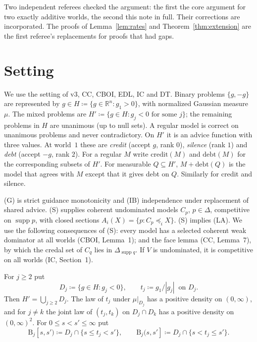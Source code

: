 \documentclass[11pt]{article}
\theoremstyle{definition}\newtheorem{definition}[theorem]{Definition}
\theoremstyle{remark}\newtheorem{remark}[theorem]{Remark}
\newcommand{\R}{\mathbb R}
\newcommand{\supp}{\operatorname{supp}}
\newcommand{\debt}{\mathrm{debt}}
\newcommand{\cred}{\mathrm{credit}}
\newcommand{\Band}{\mathrm{B}}
\begin{document}
Two independent referees checked the argument: the first the core argument
for two exactly additive worlds, the second this note in full. Their
corrections are incorporated. The proofs of Lemma~\ref{lem:rates} and
Theorem~\ref{thm:extension} are the first referee's replacements for proofs
that had gaps.

\section{Setting}\label{sec:setting}

We use the setting of v3, CC, CBOI, EDL, IC and DT. Binary problems
$\{g,-g\}$ are represented by $g\in H\coloneqq\{g\in\R^n:g_1>0\}$, with
normalized Gaussian measure $\mu$. The mixed problems are
$H'\coloneqq\{g\in H:g_j<0\text{ for some }j\}$; the remaining problems in
$H$ are unanimous (up to null sets). A regular model is correct on unanimous
problems and never contradictory. On $H'$ it is an advice function with three
values. At world~$1$ these are \emph{credit} (accept $g$, rank $0$),
\emph{silence} (rank $1$) and \emph{debt} (accept $-g$, rank $2$). For a
regular $M$ write $\cred(M)$ and $\debt(M)$ for the corresponding subsets of
$H'$. For measurable $Q\subseteq H'$, $M+\debt(Q)$ is the model that agrees
with $M$ except that it gives debt on $Q$. Similarly for credit and silence.

(G) is strict guidance monotonicity and (IB) independence under replacement
of shared advice. (S) supplies coherent undominated models $C_p$,
$p\in\Delta$, competitive on $\supp p$, with closed sections
$A_i(X)=\{p:C_p\preceq_iX\}$. (S) implies (LA). We use the following
consequences of (S): every model has a selected coherent weak dominator at
all worlds (CBOI, Lemma~1); and the face lemma (CC, Lemma~7), by which the
credal set of $C_q$ lies in $\Delta_{\supp q}$. If $V$ is undominated, it is
competitive on all worlds (IC, Section~1).

For $j\ge2$ put
\[
 D_j\coloneqq\{g\in H:g_j<0\},\qquad t_j\coloneqq g_1/|g_j|\ \text{ on }D_j.
\]
Then $H'=\bigcup_{j\ge2}D_j$. The law of $t_j$ under $\mu|_{D_j}$ has a
positive density on $(0,\infty)$, and for $j\ne k$ the joint law of
$(t_j,t_k)$ on $D_j\cap D_k$ has a positive density on $(0,\infty)^2$. For
$0\le s<s'\le\infty$ put
\[
 \Band_j[s,s')\coloneqq D_j\cap\{s\le t_j<s'\},\qquad
 \Band_j(s,s']\coloneqq D_j\cap\{s<t_j\le s'\}.
\]
\end{document}
